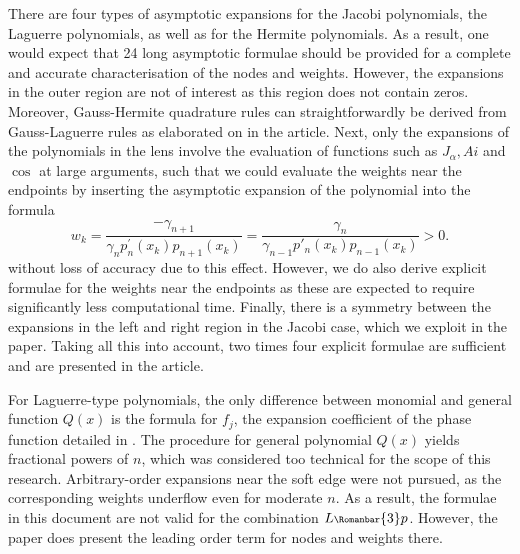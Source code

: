 \documentclass[11pt]{article}
\newcommand{\ql}{L}
\newcommand{\rr}{{\scriptsize \Romanbar{3}} }
\newcommand{\pg}{p}
\numberwithin{equation}{section}
\begin{document}
There are four types of asymptotic expansions for the Jacobi polynomials, the Laguerre polynomials, as well as for the Hermite polynomials. As a result, one would expect that 24 long asymptotic formulae should be provided for a complete and accurate characterisation of the nodes and weights. However, the expansions in the outer region are not of interest as this region does not contain zeros. Moreover, Gauss-Hermite quadrature rules can straightforwardly be derived from Gauss-Laguerre rules as elaborated on in the article. %
Next, only the expansions of the polynomials in the lens involve the evaluation of functions such as $J_\alpha, Ai$ and $\cos$ at large arguments, such that we could evaluate the weights near the endpoints by inserting the asymptotic expansion of the polynomial into the formula 
\begin{equation} 
	w_k = \frac{-\gamma_{n+1}}{\gamma_n p_n^\prime(x_k) p_{n+1}(x_k) } = \frac{\gamma_n}{\gamma_{n-1} p'_n(x_k) p_{n-1}(x_k)} > 0. \label{Eweights} 
\end{equation} %
without loss of accuracy due to this effect. However, we do also derive explicit formulae for the weights near the endpoints as these are expected to require significantly less computational time. Finally, there is a symmetry between the expansions in the left and right region in the Jacobi case, which we exploit in the paper. %
Taking all this into account, two times four explicit formulae are sufficient and are presented in the article.%

For Laguerre-type polynomials, the only difference between monomial and general function $Q(x)$ is the formula for $f_j$, the expansion coefficient of the phase function detailed in \cite[\S 6]{laguerre}. The procedure for general polynomial $Q(x)$ yields fractional powers of $n$, which was considered too technical for the scope of this research. Arbitrary-order expansions near the soft edge were not pursued, as the corresponding weights underflow even for moderate $n$. As a result, the formulae in this document %
are not valid for the combination $\ql\rr\pg$. However, the paper %
does present the leading order term for nodes and weights there.%
\end{document}
